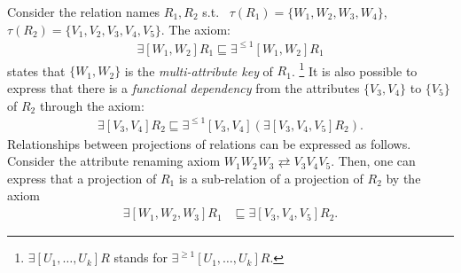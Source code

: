 \documentclass[envcountsame,draft]{llncs}
\begin{document}
\begin{example}
\label{exa:basic}
Consider the relation names $R_1, R_2$ s.t.\
%
  $\tau(R_1)  = \{W_1,W_2,W_3,W_4\}$,
  $\tau(R_2)  = \{V_1,V_2,V_3,V_4,V_5\}$.
%
The axiom:
  \begin{align*}
    \exists[W_1,W_2] R_1 \sqsubseteq \exists^{\leq 1}[W_1,W_2] R_1
  \end{align*}
states that $\{W_1,W_2\}$ is the \emph{multi-attribute key} of $R_1$.%
\footnote{$\exists[U_1,\ldots,U_k] R$ stands for $\exists^{\geq 1}[U_1,\ldots,U_k] R$.} 
It is also possible to express that there is a \emph{functional dependency} from the 
attributes $\{V_3,V_4\}$ to $\{V_5\}$ of $R_2$ through the axiom:
\begin{align}\label{funct-dep}
      \exists[V_3,V_4] R_2 \sqsubseteq \exists^{\leq 1}[V_3,V_4](\exists[V_3,V_4,V_5] R_2).
\end{align}
%
Relationships between projections of relations can be expressed as follows.
Consider the attribute renaming axiom
$W_1W_2W_3 \rightleftarrows V_3V_4V_5$.
Then, one can express 
that a projection of $R_1$ is a sub-relation of a projection of $R_2$
by the axiom
\begin{align*}
  \exists[W_1,W_2,W_3] R_1 &\sqsubseteq \exists[V_3,V_4,V_5] R_2.
\end{align*}
\end{example}


\end{document}
